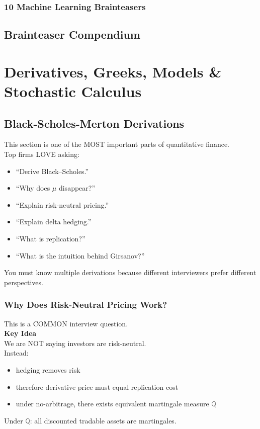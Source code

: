 \documentclass{report}
\begin{document}
\subsection*{10 Machine Learning Brainteasers}

\section{Brainteaser Compendium}

\newpage

\chapter{Derivatives, Greeks, Models \& Stochastic Calculus}


\section{Black-Scholes-Merton Derivations}

This section is one of the MOST important parts of quantitative finance. \\
Top firms LOVE asking:
\begin{itemize}
    \item “Derive Black–Scholes.”
    \item “Why does $\mu$ disappear?”
    \item “Explain risk-neutral pricing.”
    \item “Explain delta hedging.”
    \item “What is replication?”
    \item “What is the intuition behind Girsanov?”
\end{itemize}
You must know multiple derivations because different interviewers prefer different perspectives.


\subsection*{Why Does Risk-Neutral Pricing Work?}

This is a COMMON interview question.\\
\textbf{Key Idea}\\
We are NOT saying investors are risk-neutral.\\
Instead:
\begin{itemize}
    \item hedging removes risk
    \item therefore derivative price must equal replication cost
    \item under no-arbitrage, there exists equivalent martingale measure $\mathbb{Q}$ 
\end{itemize}
Under $\mathbb{Q}$: all discounted tradable assets are martingales.
\end{document}
